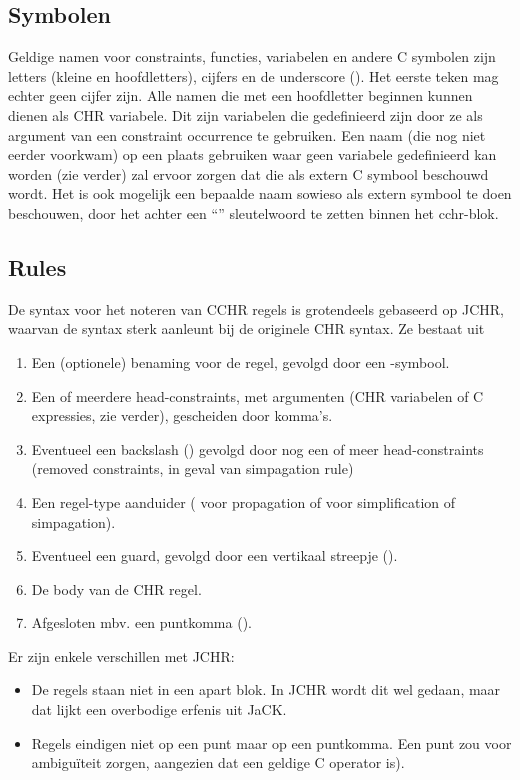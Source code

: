 \subsection{Symbolen}

Geldige namen voor constraints, functies, variabelen en andere C symbolen zijn letters (kleine en hoofdletters), cijfers en de underscore (\code{\_}). Het eerste teken mag echter geen cijfer zijn. Alle namen die met een hoofdletter beginnen kunnen dienen als CHR variabele. Dit zijn variabelen die gedefinieerd zijn door ze als argument van een constraint occurrence te gebruiken. Een naam (die nog niet eerder voorkwam) op een plaats gebruiken waar geen variabele gedefinieerd kan worden (zie verder) zal ervoor zorgen dat die als extern C symbool beschouwd wordt. Het is ook mogelijk een bepaalde naam sowieso als extern symbool te doen beschouwen, door het achter een ``'' sleutelwoord te zetten binnen het cchr-blok.

\subsection{Rules} \label{sec:rules}

De syntax voor het noteren van CCHR regels is grotendeels gebaseerd op JCHR, waarvan de syntax sterk aanleunt bij de
originele CHR syntax. Ze bestaat uit \begin{enumerate}
  \item Een (optionele) benaming voor de regel, gevolgd door een -symbool.
  \item Een of meerdere head-constraints, met argumenten (CHR variabelen of C expressies, zie verder), gescheiden door komma's.
  \item Eventueel een backslash (\code{$\backslash$}) gevolgd door nog een of meer head-constraints (removed constraints, in geval van simpagation rule)
  \item Een regel-type aanduider (\code{==>} voor propagation of \code{<=>} voor simplification of simpagation).
  \item Eventueel een guard, gevolgd door een vertikaal streepje (\code{|}).
  \item De body van de CHR regel.
  \item Afgesloten mbv. een puntkomma (\code{;}).
\end{enumerate}

Er zijn enkele verschillen met JCHR: \begin{itemize}
  \item De regels staan niet in een apart  blok. In JCHR wordt dit wel gedaan, maar dat lijkt een overbodige erfenis uit JaCK.
  \item Regels eindigen niet op een punt maar op een puntkomma. Een punt zou voor ambigu\"iteit zorgen, aangezien dat een geldige C operator is).
\end{itemize}

